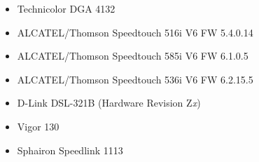 \begin{itemize}
\item Technicolor DGA 4132
\end{itemize}

\begin{itemize}
\item ALCATEL/Thomson Speedtouch 516i V6 FW 5.4.0.14
\item ALCATEL/Thomson Speedtouch 585i V6 FW 6.1.0.5
\item ALCATEL/Thomson Speedtouch 536i V6 FW 6.2.15.5
\end{itemize}

\begin{itemize}
\item D-Link DSL-321B
(Hardware Revision Z\emph{x})
\end{itemize}

\begin{itemize}
\item Vigor 130
\end{itemize}

\begin{itemize}
\item Sphairon Speedlink 1113
\end{itemize}



